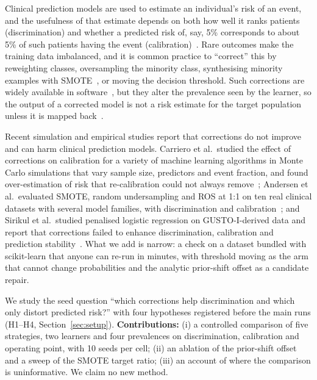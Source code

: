 Clinical prediction models are used to estimate an individual's risk of an event, and the usefulness of that estimate depends on both how well it ranks patients (discrimination) and whether a predicted risk of, say, 5\% corresponds to about 5\% of such patients having the event (calibration)~\cite{guo2017calibration}. Rare outcomes make the training data imbalanced, and it is common practice to ``correct'' this by reweighting classes, oversampling the minority class, synthesising minority examples with SMOTE~\cite{chawla2011smote}, or moving the decision threshold. Such corrections are widely available in software~\cite{lemaitre2016imbalanced,pedregosa2012scikit}, but they alter the prevalence seen by the learner, so the output of a corrected model is not a risk estimate for the target population unless it is mapped back~\cite{pozzolo2015calibrating}.

Recent simulation and empirical studies report that corrections do not improve and can harm clinical prediction models. Carriero et al.\ studied the effect of corrections on calibration for a variety of machine learning algorithms in Monte Carlo simulations that vary sample size, predictors and event fraction, and found over-estimation of risk that re-calibration could not always remove~\cite{carriero2024harms}; Andersen et al.\ evaluated SMOTE, random undersampling and ROS at 1:1 on ten real clinical datasets with several model families, with discrimination and calibration~\cite{andersen2026tipping}; and Sirikul et al.\ studied penalised logistic regression on GUSTO-I-derived data and report that corrections failed to enhance discrimination, calibration and prediction stability~\cite{sirikul2026class}. What we add is narrow: a check on a dataset bundled with scikit-learn that anyone can re-run in minutes, with threshold moving as the arm that cannot change probabilities and the analytic prior-shift offset as a candidate repair.

We study the seed question ``which corrections help discrimination and which only distort predicted risk?'' with four hypotheses registered before the main runs (H1--H4, Section~\ref{sec:setup}). \textbf{Contributions:} (i) a controlled comparison of five strategies, two learners and four prevalences on discrimination, calibration and operating point, with 10 seeds per cell; (ii) an ablation of the prior-shift offset and a sweep of the SMOTE target ratio; (iii) an account of where the comparison is uninformative. We claim no new method.
